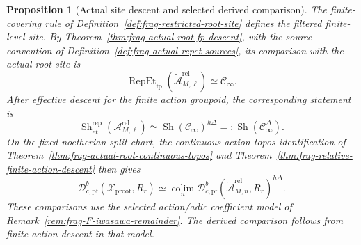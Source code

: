 \documentclass[11pt]{article}
\newtheorem{proposition}[theorem]{Proposition}
\theoremstyle{definition}
\theoremstyle{remark}
\begin{document}
\begin{proposition}[Actual site descent and selected derived comparison]
\label{lem:frag-pro-root-site-descent}
The finite-covering rule of Definition~\ref{def:frag-restricted-root-site}
defines the filtered finite-level site.  By
Theorem~\ref{thm:frag-actual-root-fp-descent}, with the source convention
of Definition~\ref{def:frag-actual-repet-sources}, its comparison with
the actual root site is
\begin{equation}
\operatorname{RepEt}_{\mathrm{fp}}
(\widetilde{\mathcal A}_{M,\ell}^{\mathrm{rel}})
\simeq\mathcal C_\infty.
\label{eq:frag-pro-site-descent}
\end{equation}
After effective descent for the finite action groupoid, the corresponding
statement is
\begin{equation}
\operatorname{Sh}_{\acute et}^{\mathrm{rep}}
(\mathcal A_{M,\ell}^{\mathrm{rel}})
\simeq\operatorname{Sh}(\mathcal C_\infty)^ {h\Delta}
=: \operatorname{Sh}(\mathcal C_\infty^\Delta).
\label{eq:frag-pro-site-delta-descent}
\end{equation}
On the fixed noetherian split chart, the continuous-action topos
identification of Theorem~\ref{thm:frag-actual-root-continuous-topos} and
Theorem~\ref{thm:frag-relative-finite-action-descent} then gives
\begin{equation}
\mathcal D^b_{c,\mathrm{pf}}(\mathscr X_{\mathrm{proot}},R_r)
\simeq\operatorname*{colim}_n
\mathcal D^b_{c,\mathrm{pf}}
(\widetilde{\mathcal A}_{M,n}^{\mathrm{rel}},R_r)^{h\Delta}.
\label{eq:frag-pro-root-derived-descent}
\end{equation}
These comparisons use the selected action/adic coefficient model of
Remark~\ref{rem:frag-F-iwasawa-remainder}.  The derived comparison
follows from finite-action descent in that model.
\end{proposition}
\end{document}
